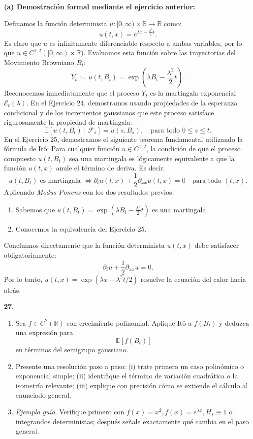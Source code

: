 \documentclass[11pt, letterpaper]{article}
\begin{document}
\begin{solucion}
    \vspace{3mm}
    \textbf{(a) Demostración formal mediante el ejercicio anterior:}

    Definamos la función determinista $u: [0, \infty) \times \mathbb{R} \to \mathbb{R}$ como:
    \[ u(t,x) = e^{\lambda x - \frac{\lambda^2}{2} t}. \]
    Es claro que $u$ es infinitamente diferenciable respecto a ambas variables, por lo que $u \in C^{1,2}([0, \infty) \times \mathbb{R})$.
    Evaluamos esta función sobre las trayectorias del Movimiento Browniano $B_t$:
    \[ Y_t := u(t, B_t) = \exp\left( \lambda B_t - \frac{\lambda^2}{2} t \right). \]
    Reconocemos inmediatamente que el proceso $Y_t$ es la martingala exponencial $\mathcal{E}_t(\lambda)$. En el Ejercicio 24, demostramos usando propiedades de la esperanza condicional y de los incrementos gaussianos que este proceso satisface rigurosamente la propiedad de martingala:
    \[ \mathbb{E}[u(t, B_t) \mid \mathcal{F}_s] = u(s, B_s), \quad \text{para todo } 0 \le s \le t. \]
    En el Ejercicio 25, demostramos el siguiente teorema fundamental utilizando la fórmula de Itô: Para cualquier función $u \in C^{1,2}$, la condición de que el proceso compuesto $u(t, B_t)$ sea una martingala es lógicamente equivalente a que la función $u(t,x)$ anule el término de deriva. Es decir:
    \[ u(t, B_t) \text{ es martingala } \iff \partial_t u(t,x) + \frac{1}{2}\partial_{xx} u(t,x) = 0 \quad \text{para todo } (t,x). \]
    Aplicando \textit{Modus Ponens} con los dos resultados previos:
    \begin{enumerate}
        \item Sabemos que $u(t, B_t) = \exp\left( \lambda B_t - \frac{\lambda^2}{2} t \right)$ es una martingala.
        \item Conocemos la equivalencia del Ejercicio 25.
    \end{enumerate}
    Concluimos directamente que la función determinista $u(t, x)$ debe satisfacer obligatoriamente:
    \[ \partial_t u + \frac{1}{2}\partial_{xx} u = 0. \]
    Por lo tanto, $u(t,x) = \exp(\lambda x - \lambda^2 t / 2)$ resuelve la ecuación del calor hacia atrás.
\end{solucion}

\newpage

\begin{ejercicio}
    \textbf{27.} 
    \begin{enumerate}
        \item Sea $f \in C^2(\mathbb{R})$ con crecimiento polinomial. Aplique Itô a $f(B_t)$ y deduzca una expresión para
        \[ \mathbb{E}[f(B_t)] \]
        en términos del semigrupo gaussiano.
        \item Presente una resolución paso a paso: (i) trate primero un caso polinómico o exponencial simple; (ii) identifique el término de variación cuadrática o la isometría relevante; (iii) explique con precisión cómo se extiende el cálculo al enunciado general.
        \item \textit{Ejemplo guía}. Verifique primero con $f(x) = x^2, f(x) = e^{\lambda x}, H_s \equiv 1$ o integrandos deterministas; después señale exactamente qué cambia en el paso general.
    \end{enumerate}
\end{ejercicio}
\end{document}
